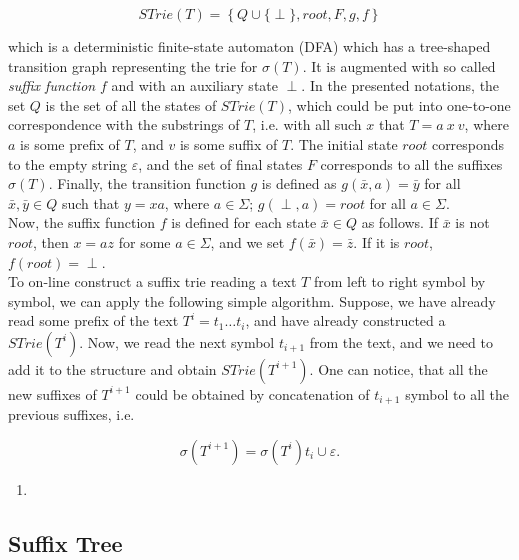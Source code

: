 \documentclass[paper=a4, fontsize=11pt]{scrartcl} %
\numberwithin{equation}{section} %
\numberwithin{figure}{section} %
\numberwithin{table}{section} %
\begin{document}
\begin{equation}
STrie(T) = \left\{Q \cup \{\perp\}, root, F, g, f \right\}
\end{equation}

which is a deterministic finite-state automaton (DFA) which has a tree-shaped transition graph representing the trie for $\sigma(T)$. It is augmented with so called \textit{suffix function} $f$ and with an auxiliary state $\perp$. In the presented notations, the set $Q$ is the set of all the states of $STrie(T)$, which could be put into one-to-one correspondence with the substrings of $T$, i.e. with all such $x$ that $T = a\ x\ v$, where $a$ is some prefix of $T$, and $v$ is some suffix of $T$. The initial state $root$ corresponds to the empty string $\varepsilon$, and the set of final states $F$ corresponds to all the suffixes $\sigma(T)$. Finally, the transition function $g$ is defined as $g(\bar{x}, a) = \bar{y}$ for all $\bar{x}, \bar{y} \in Q$ such that $y = xa$, where $a \in \Sigma$; $g(\perp, a) = root$ for all $a \in \Sigma$.\\

Now, the suffix function $f$ is defined for each state $\bar{x} \in Q$ as follows. If $\bar{x}$ is not $root$, then $x = az$ for some $a \in \Sigma$, and we set $f(\bar{x}) = \bar{z}$. If it is $root$, $f(root) = \perp$.\\

To on-line construct a suffix trie reading a text $T$ from left to right symbol by symbol, we can apply the following simple algorithm. Suppose, we have already read some prefix of the text $T^i = t_1 \dots t_i$, and have already constructed a $STrie(T^i)$. Now, we read the next symbol $t_{i+1}$ from the text, and we need to add it to the structure and obtain $STrie(T^{i+1})$. One can notice, that all the new suffixes of $T^{i+1}$ could be obtained by concatenation of $t_{i+1}$ symbol to all the previous suffixes, i.e.

$$
\sigma(T^{i+1}) = \sigma(T^i)t_i \cup \varepsilon.
$$


\begin{enumerate}
  \item
\end{enumerate}


\subsection{Suffix Tree}
\end{document}
